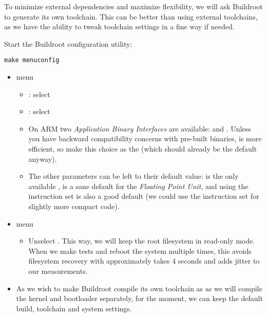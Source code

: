 To minimize external dependencies and maximize flexibility, we will ask
Buildroot to generate its own toolchain. This can be better than using
external toolchains, as we have the ability to tweak toolchain settings
in a fine way if needed.

Start the Buildroot configuration utility:

\begin{verbatim}
make menuconfig
\end{verbatim}

\begin{itemize}

\item {} menu
  \begin{itemize}

  \item {}: select 

  \item {}: select 

  \item On ARM two {\em Application Binary Interfaces} are available:
     and . Unless you have backward
    compatibility concerns with pre-built binaries,  is
    more efficient, so make this choice as the 
    (which should already be the default anyway).

  \item The other parameters can be left to their default value:
     is the only available ,
     is a sane default for the {\em Floating Point
      Unit}, and using the  instruction set is also a good
    default (we could use the  instruction set for
    slightly more compact code).
  \end{itemize}

\item {} menu
  \begin{itemize}
  \item Unselect .
    This way, we will keep the root filesystem in read-only mode. When
    we make tests and reboot the system multiple times, this avoids
    filesystem recovery with approximately takes 4 seconds and adds
    jitter to our measurements.
  \end{itemize}
\item As we wish to make Buildroot compile its own toolchain as as we
will compile the kernel and bootloader separately, for the moment, we
can keep the default build, toolchain and system settings.


\end{itemize}
